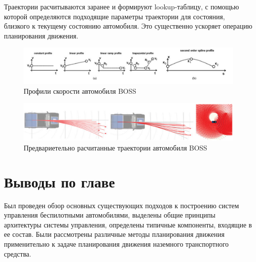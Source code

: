 Траектории расчитываются заранее и формируют lookup-таблицу, с помощью которой определяются подходящие параметры траектории
для состояния, близкого к текущему состоянию автомобиля. Это существенно ускоряет операцию планирования движения.

\begin{figure}[h]
    \centering
    \includegraphics[width=\linewidth]{images/boss_velocity_prifiles}
    \caption{Профили скорости автомобиля BOSS}
    \label{img:boss_velocity_prifiles}
\end{figure}


\begin{figure}[h]
    \centering
    \includegraphics[width=\linewidth]{images/boss_lattice_gen}
    \caption{Предвариетельно расчитанные траектории автомобиля BOSS}
    \label{img:boss_lattice_gen}
\end{figure}


\section{Выводы по главе}
Был проведен обзор основных существующих подходов к построению систем управления беспилотными автомобилями,
выделены общие принципы архитектуры системы управления, определены типичные компоненты, входящие в ее состав.
Были рассмотрены различные методы планирования движения применительно к задаче планирования движения
наземного транспортного средства.